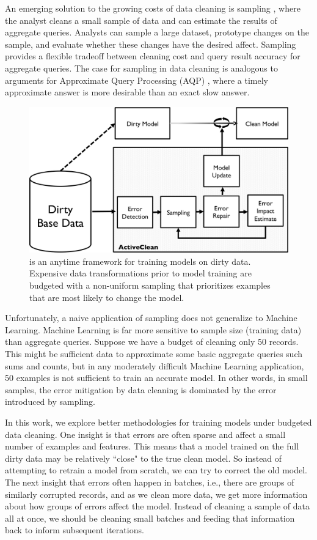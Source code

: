 An emerging solution to the growing costs of data cleaning is sampling \cite{wang1999sample}, where the analyst cleans a small sample of data and can estimate the results of aggregate queries.
Analysts can sample a large dataset, prototype changes on the sample, and evaluate whether these changes have the desired affect.
Sampling provides a flexible tradeoff between cleaning cost and query result accuracy for aggregate queries.
The case for sampling in data cleaning is analogous to arguments for Approximate Query Processing (AQP) \cite{DBLP:conf/eurosys/AgarwalMPMMS13}, where a timely approximate answer is more desirable than an exact slow answer. 

\begin{figure}[t]
\centering
 \includegraphics[width=\columnwidth]{figs/arch.png}
 \caption{\sysfull is an anytime framework for training models on dirty data. Expensive data transformations prior to model training are budgeted with a non-uniform sampling that prioritizes examples that are most likely to change the model.  \label{sys-arch}}
\end{figure}

Unfortunately, a naive application of sampling does not generalize to Machine Learning.
Machine Learning is far more sensitive to sample size (training data) than aggregate queries.
Suppose we have a budget of cleaning only 50 records.
This might be sufficient data to approximate some basic aggregate queries such sums and counts, but in any moderately difficult Machine Learning application, 50 examples is not sufficient to train an accurate model.
In other words, in small samples, the error mitigation by data cleaning is dominated by the error introduced by sampling.

In this work, we explore better methodologies for training models under budgeted data cleaning.
One insight is that errors are often sparse and affect a small number of examples and features.
This means that a model trained on the full dirty data may be relatively ``close" to the true clean model.
So instead of attempting to retrain a model from scratch, we can try to correct the old model.
The next insight that errors often happen in batches, i.e., there are groups of similarly corrupted records, and as we clean more data, we get more information about how groups of errors affect the model.
Instead of cleaning a sample of data all at once, we should be cleaning small batches and feeding that information back to inform subsequent iterations.

